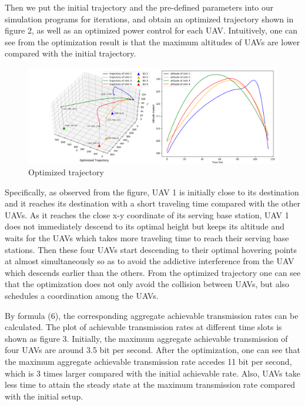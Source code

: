\documentclass[10pt,final,conference]{IEEEtran}
\begin{document}
Then we put the initial trajectory and the pre-defined parameters into our simulation programs for iterations, and obtain an optimized trajectory shown in figure 2, as well as an optimized power control for each UAV. Intuitively, one can see from the optimization result is that the maximum altitudes of UAVs are lower compared with the initial trajectory. 
\begin{figure}[H]
	\includegraphics[width=\linewidth]{opt_trajectory.png}
	\caption{Optimized trajectory}
\end{figure}
Specifically, as observed from the figure, UAV 1 is initially close to its destination and it reaches its destination with a short traveling time compared with the other UAVs. As it reaches the close x-y coordinate of its serving base station, UAV 1 does not immediately descend to its optimal height but keeps its altitude and waits for the UAVs which takes more traveling time to reach their serving base stations. Then these four UAVs start descending to their optimal hovering points at almost simultaneously so as to avoid the addictive interference from the UAV which descends earlier than the others. From the optimized trajectory one can see that the optimization does not only avoid the collision between UAVs, but also schedules a coordination among the UAVs. \par 
By formula (6), the corresponding aggregate achievable transmission rates can be calculated. The plot of achievable transmission rates at different time slots is shown as figure 3. Initially, the maximum aggregate achievable transmission of four UAVs are around 3.5 bit per second. After the optimization, one can see that the maximum aggregate achievable transmission rate accedes 11 bit per second, which is 3 times larger compared with the initial achievable rate. Also, UAVs take less time to attain the steady state at the maximum transmission rate compared with the initial setup. 
\end{document}
